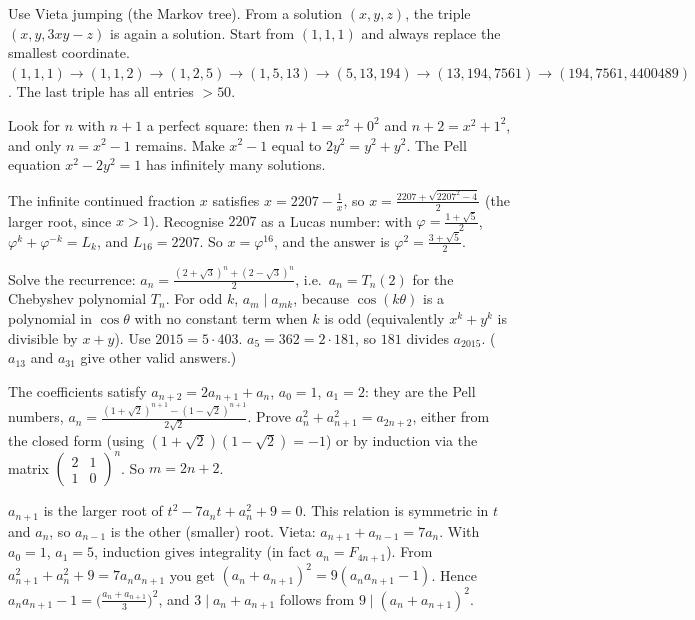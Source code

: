 \documentclass[11pt,a4paper]{article}
\begin{document}

 Use Vieta jumping (the Markov tree). From a solution $(x,y,z)$, the triple $(x,y,3xy-z)$ is again a solution. Start from $(1,1,1)$ and always replace the smallest coordinate.
 $(1,1,1)\to(1,1,2)\to(1,2,5)\to(1,5,13)\to(5,13,194)\to(13,194,7561)\to(194,7561,4400489)$. The last triple has all entries $>50$.

 Look for $n$ with $n+1$ a perfect square: then $n+1=x^2+0^2$ and $n+2=x^2+1^2$, and only $n=x^2-1$ remains.
 Make $x^2-1$ equal to $2y^2=y^2+y^2$. The Pell equation $x^2-2y^2=1$ has infinitely many solutions.

 The infinite continued fraction $x$ satisfies $x=2207-\frac1x$, so $x=\frac{2207+\sqrt{2207^2-4}}2$ (the larger root, since $x>1$).
 Recognise $2207$ as a Lucas number: with $\varphi=\frac{1+\sqrt5}2$, $\varphi^{k}+\varphi^{-k}=L_k$, and $L_{16}=2207$. So $x=\varphi^{16}$, and the answer is $\varphi^2=\frac{3+\sqrt5}2$.

 Solve the recurrence: $a_n=\frac{(2+\sqrt3)^n+(2-\sqrt3)^n}2$, i.e.\ $a_n=T_n(2)$ for the Chebyshev polynomial $T_n$.
 For odd $k$, $a_m\mid a_{mk}$, because $\cos(k\theta)$ is a polynomial in $\cos\theta$ with no constant term when $k$ is odd (equivalently $x^k+y^k$ is divisible by $x+y$). Use $2015=5\cdot403$.
 $a_5=362=2\cdot181$, so $181$ divides $a_{2015}$. ($a_{13}$ and $a_{31}$ give other valid answers.)

 The coefficients satisfy $a_{n+2}=2a_{n+1}+a_n$, $a_0=1$, $a_1=2$: they are the Pell numbers, $a_n=\frac{(1+\sqrt2)^{n+1}-(1-\sqrt2)^{n+1}}{2\sqrt2}$.
 Prove $a_n^2+a_{n+1}^2=a_{2n+2}$, either from the closed form (using $(1+\sqrt2)(1-\sqrt2)=-1$) or by induction via the matrix $\begin{pmatrix}2&1\\1&0\end{pmatrix}^n$. So $m=2n+2$.

 $a_{n+1}$ is the larger root of $t^2-7a_nt+a_n^2+9=0$. This relation is symmetric in $t$ and $a_n$, so $a_{n-1}$ is the other (smaller) root.
 Vieta: $a_{n+1}+a_{n-1}=7a_n$. With $a_0=1$, $a_1=5$, induction gives integrality (in fact $a_n=F_{4n+1}$).
 From $a_{n+1}^2+a_n^2+9=7a_na_{n+1}$ you get $(a_n+a_{n+1})^2=9(a_na_{n+1}-1)$. Hence $a_na_{n+1}-1=\bigl(\frac{a_n+a_{n+1}}3\bigr)^2$, and $3\mid a_n+a_{n+1}$ follows from $9\mid(a_n+a_{n+1})^2$.
\end{document}
